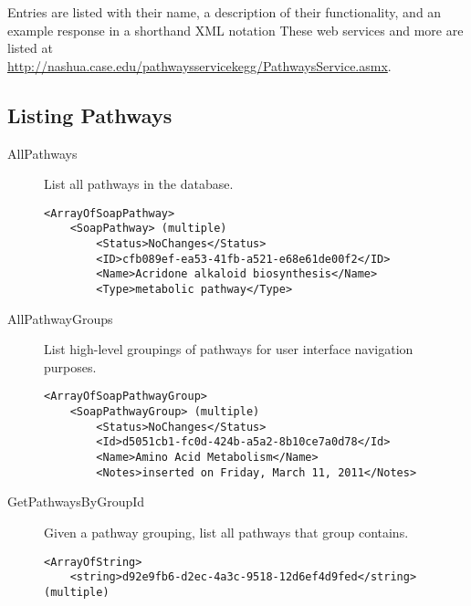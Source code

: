 Entries are listed with their name, a description of their functionality, and
an example response in a shorthand XML notation These web services and more
are listed at \\
\href{http://nashua.case.edu/pathwaysservicekegg/PathwaysService.asmx}{http://nashua.case.edu/pathwaysservicekegg/PathwaysService.asmx}.

\subsection{Listing Pathways}
\begin{description}

    \item[AllPathways] List all pathways in the \pathcasekegg database.

    \begin{lstlisting}
<ArrayOfSoapPathway>
    <SoapPathway> (multiple)
        <Status>NoChanges</Status>
        <ID>cfb089ef-ea53-41fb-a521-e68e61de00f2</ID>
        <Name>Acridone alkaloid biosynthesis</Name>
        <Type>metabolic pathway</Type>
    \end{lstlisting}

    \item[AllPathwayGroups] List high-level groupings of pathways for user
    interface navigation purposes.

    \begin{lstlisting}
<ArrayOfSoapPathwayGroup>
    <SoapPathwayGroup> (multiple)
        <Status>NoChanges</Status>
        <Id>d5051cb1-fc0d-424b-a5a2-8b10ce7a0d78</Id>
        <Name>Amino Acid Metabolism</Name>
        <Notes>inserted on Friday, March 11, 2011</Notes>
    \end{lstlisting}

    \item[GetPathwaysByGroupId] Given a pathway grouping, list all pathways
    that group contains.

    \begin{lstlisting}
<ArrayOfString>
    <string>d92e9fb6-d2ec-4a3c-9518-12d6ef4d9fed</string> (multiple)
    \end{lstlisting}

\end{description}

